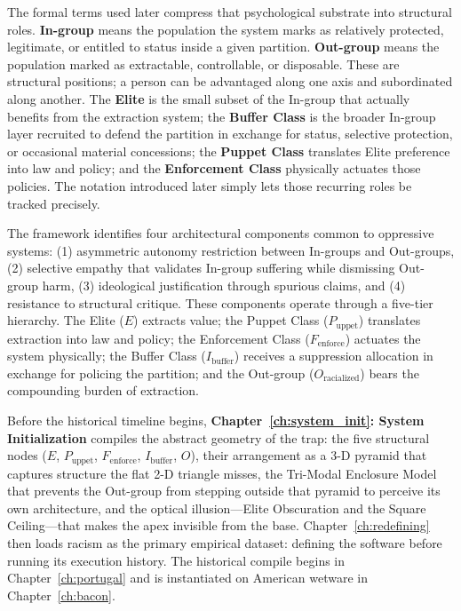 \documentclass[12pt,openany]{book}
\numberwithin{equation}{chapter}
\begin{document}
The formal terms used later compress that psychological substrate into structural roles. \textbf{In-group} means the population the system marks as relatively protected, legitimate, or entitled to status inside a given partition. \textbf{Out-group} means the population marked as extractable, controllable, or disposable. These are structural positions; a person can be advantaged along one axis and subordinated along another. The \textbf{Elite} is the small subset of the In-group that actually benefits from the extraction system; the \textbf{Buffer Class} is the broader In-group layer recruited to defend the partition in exchange for status, selective protection, or occasional material concessions; the \textbf{Puppet Class} translates Elite preference into law and policy; and the \textbf{Enforcement Class} physically actuates those policies. The notation introduced later simply lets those recurring roles be tracked precisely.

The framework identifies four architectural components common to oppressive systems: (1) asymmetric autonomy restriction between In-groups and Out-groups, (2) selective empathy that validates In-group suffering while dismissing Out-group harm, (3) ideological justification through spurious claims, and (4) resistance to structural critique. These components operate through a five-tier hierarchy. The Elite ($E$) extracts value; the Puppet Class ($P_{\text{uppet}}$) translates extraction into law and policy; the Enforcement Class ($F_{\text{enforce}}$) actuates the system physically; the Buffer Class ($I_{\text{buffer}}$) receives a suppression allocation in exchange for policing the partition; and the Out-group ($O_{\text{racialized}}$) bears the compounding burden of extraction.

Before the historical timeline begins, \textbf{Chapter~\ref{ch:system_init}: System Initialization}
compiles the abstract geometry of the trap: the five structural nodes ($E$,
$P_{\text{uppet}}$, $F_{\text{enforce}}$, $I_{\text{buffer}}$, $O$), their
arrangement as a 3-D pyramid that captures structure the flat 2-D triangle misses, the Tri-Modal
Enclosure Model that prevents the Out-group from stepping outside that pyramid
to perceive its own architecture, and the optical illusion---Elite Obscuration
and the Square Ceiling---that makes the apex invisible from the base.
Chapter~\ref{ch:redefining} then loads racism as the primary empirical
dataset: defining the software before running its execution history. The
historical compile begins in Chapter~\ref{ch:portugal} and is instantiated
on American wetware in Chapter~\ref{ch:bacon}.
\end{document}
